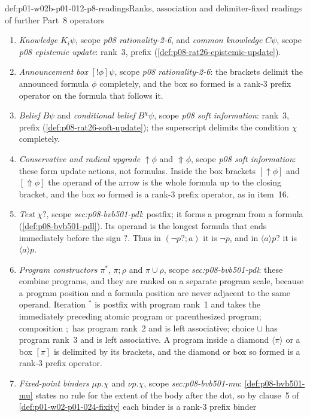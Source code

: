 \begin{hbconvention}{def:p01-w02b-p01-012-p8-readings}{Ranks, association and delimiter-fixed readings of further Part~8 operators}
\begin{enumerate}
\item \emph{Knowledge} \(K_i\psi\), scope \emph{p08 rationality-2-6}, and
  \emph{common knowledge} \(C\psi\), scope \emph{p08 epistemic update}:
  rank~3, prefix (\cref{def:p08-rat26-epistemic-update}).
\item \emph{Announcement box} \([!\phi]\psi\), scope
  \emph{p08 rationality-2-6}: the brackets delimit the announced formula
  \(\phi\) completely, and the box so formed is a rank-3 prefix operator
  on the formula that follows it.
\item \emph{Belief} \(B\psi\) and \emph{conditional belief}
  \(B^\chi\psi\), scope \emph{p08 soft information}: rank~3, prefix
  (\cref{def:p08-rat26-soft-update}); the superscript delimits the
  condition \(\chi\) completely.
\item \emph{Conservative and radical upgrade} \(\uparrow\phi\) and
  \(\Uparrow\phi\), scope \emph{p08 soft information}: these form update
  actions, not formulas.  Inside the box brackets \([\uparrow\phi]\) and
  \([\Uparrow\phi]\) the operand of the arrow is the whole formula up to
  the closing bracket, and the box so formed is a rank-3 prefix operator,
  as in item~16.
\item \emph{Test} \(\chi?\), scope \emph{sec:p08-bvb501-pdl}: postfix; it
  forms a program from a formula (\cref{def:p08-bvb501-pdl}).  Its operand
  is the longest formula that ends immediately before the sign \(?\).  Thus in \((\neg p?;a)\) it is
  \(\neg p\), and in \(\langle a\rangle p?\) it is \(\langle a\rangle p\).
\item \emph{Program constructors} \(\pi^*\), \(\pi;\rho\) and
  \(\pi\cup\rho\), scope \emph{sec:p08-bvb501-pdl}: these combine
  programs, and they are ranked on a separate program scale, because a
  program position and a formula position are never adjacent to the same
  operand.  Iteration \({}^*\) is postfix with program rank~1 and takes the
  immediately preceding atomic program or parenthesized program;
  composition \(;\) has program rank~2 and is left associative; choice
  \(\cup\) has program rank~3 and is left associative.  A program inside a
  diamond \(\langle\pi\rangle\) or a box \([\pi]\) is delimited by its
  brackets, and the diamond or box so formed is a rank-3 prefix operator.
\item \emph{Fixed-point binders} \(\mu p.\chi\) and \(\nu p.\chi\), scope
  \emph{sec:p08-bvb501-mu}: \cref{def:p08-bvb501-mu} states no rule for
  the extent of the body after the dot, so by clause~5 of
  \cref{def:p01-w02-p01-024-fixity} each binder is a rank-3 prefix binder

\end{enumerate}
\end{hbconvention}
